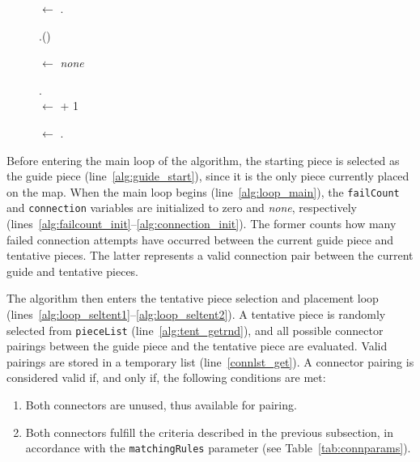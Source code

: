 \documentclass[journal]{IEEEtran}
\begin{document}
\begin{figure}[!t]
\begin{algorithm}[H]
{{      
      {
        \label{alg:loop_selconn1}

        \Connection $\leftarrow$ \ConnList.\GetRandomItem{} \label{alg:conn_get}

        {
          \ConnList.\Remove(\Connection)  \label{alg:conn_remove}

          \Connection $\leftarrow$ \textit{none}  \label{alg:loop_selconn2}
        }
      }
      {
        \GuidePiece.\SnapWith{\TentativePiece, \Connection} \label{alg:snap}\\
      }
      \Else
      {
        \FailCount $\leftarrow$ \FailCount + 1
      }
    } \label{alg:loop_seltent2}
    \GuidePiece $\leftarrow$ \SelMethod.\SelectGuidePiece{\Map} \label{alg:guide_next}
  } \label{alg:theend}

\end{algorithm}

\end{figure}

Before entering the main loop of the algorithm, the starting piece is selected as the guide
piece (line~\ref{alg:guide_start}), since it is the only piece currently placed on the map.
When the main loop begins (line~\ref{alg:loop_main}), the \texttt{failCount}
and \texttt{connection} variables are initialized to zero and \textit{none}, respectively
(lines~\ref{alg:failcount_init}--\ref{alg:connection_init}). The former counts how many
failed connection attempts have occurred between the current guide piece and tentative
pieces. The latter represents a valid connection pair between the current guide and
tentative pieces.

The algorithm then enters the tentative piece selection and placement loop
(lines~\ref{alg:loop_seltent1}--\ref{alg:loop_seltent2}). A tentative piece is randomly
selected from \texttt{pieceList} (line~\ref{alg:tent_getrnd}), and all possible connector
pairings between the guide piece and the tentative piece are evaluated. Valid pairings
are stored in a temporary list (line~\ref{connlst_get}). A connector pairing is considered
valid if, and only if, the following conditions are met:

\begin{enumerate}
  \item Both connectors are unused, thus available for pairing.
  \item Both connectors fulfill the criteria described in the previous
    subsection, in accordance with the \texttt{matchingRules} parameter
    (see Table~\ref{tab:connparams}).
\end{enumerate}
\end{document}
